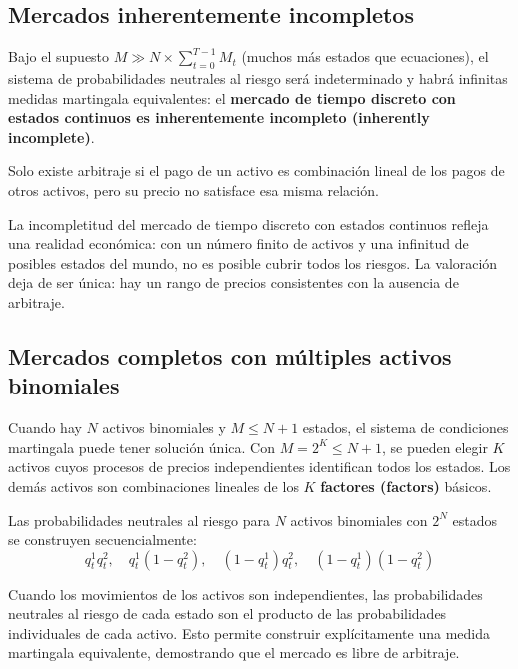 \documentclass[12pt]{article}
\begin{document}
\subsection{Mercados inherentemente incompletos}

Bajo el supuesto $M \gg N \times \sum_{t=0}^{T-1} M_t$ (muchos m\'as estados que ecuaciones), el sistema de probabilidades neutrales al riesgo ser\'a indeterminado y habr\'a infinitas medidas martingala equivalentes: el \textbf{mercado de tiempo discreto con estados continuos es inherentemente incompleto (inherently incomplete)}.

Solo existe arbitraje si el pago de un activo es combinaci\'on lineal de los pagos de otros activos, pero su precio no satisface esa misma relaci\'on.

\begin{intuicion}
La incompletitud del mercado de tiempo discreto con estados continuos refleja una realidad econ\'omica: con un n\'umero finito de activos y una infinitud de posibles estados del mundo, no es posible cubrir todos los riesgos. La valoraci\'on deja de ser \'unica: hay un rango de precios consistentes con la ausencia de arbitraje.
\end{intuicion}

\subsection{Mercados completos con m\'ultiples activos binomiales}

Cuando hay $N$ activos binomiales y $M \leq N+1$ estados, el sistema de condiciones martingala puede tener soluci\'on \'unica. Con $M = 2^K \leq N+1$, se pueden elegir $K$ activos cuyos procesos de precios independientes identifican todos los estados. Los dem\'as activos son combinaciones lineales de los $K$ \textbf{factores (factors)} b\'asicos.

Las probabilidades neutrales al riesgo para $N$ activos binomiales con $2^N$ estados se construyen secuencialmente:
\begin{equation}
    q_t^1 q_t^2, \quad q_t^1(1-q_t^2), \quad (1-q_t^1)q_t^2, \quad (1-q_t^1)(1-q_t^2)
\end{equation}

\begin{intuicionmat}
Cuando los movimientos de los activos son independientes, las probabilidades neutrales al riesgo de cada estado son el producto de las probabilidades individuales de cada activo. Esto permite construir expl\'icitamente una medida martingala equivalente, demostrando que el mercado es libre de arbitraje.
\end{intuicionmat}
\end{document}
